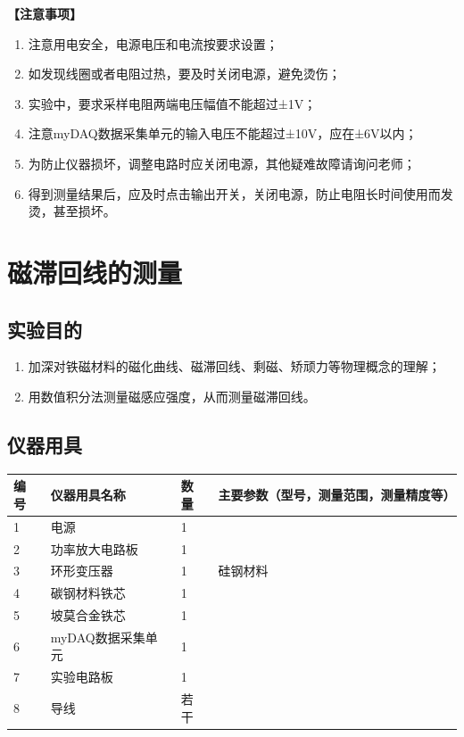 \documentclass[dvipsnames, svgnames,a4paper,11pt]{article}
\begin{document}
{\textbf{【注意事项】}
\begin{enumerate}
	\item 注意用电安全，电源电压和电流按要求设置；
	\item 如发现线圈或者电阻过热，要及时关闭电源，避免烫伤；
	\item 实验中，要求采样电阻两端电压幅值不能超过±1V；
    \item 注意myDAQ数据采集单元的输入电压不能超过±10V，应在±6V以内；
    \item 为防止仪器损坏，调整电路时应关闭电源，其他疑难故障请询问老师；
    \item 得到测量结果后，应及时点击输出开关，关闭电源，防止电阻长时间使用而发烫，甚至损坏。
    
\end{enumerate}}

\clearpage
\tableofcontents
\clearpage

\setcounter{section}{0}
\section{磁滞回线的测量}
	
\subsection{实验目的}
\begin{enumerate}
	\item 加深对铁磁材料的磁化曲线、磁滞回线、剩磁、矫顽力等物理概念的理解；
	\item 用数值积分法测量磁感应强度，从而测量磁滞回线。
\end{enumerate}

\subsection{仪器用具}
\begin{table}[htbp]
	\centering
	\renewcommand\arraystretch{1.6}
	\begin{tabular}{p{}|p{}|p{}|p{}}
	\hline
	编号& 仪器用具名称 & 数量 &  主要参数（型号，测量范围，测量精度等） \\
	\hline
	1&电源&1 &\\
	\hline
	2&功率放大电路板 &1&\\
	\hline
	3&环形变压器 & 1 &硅钢材料 \\
	\hline
	4&碳钢材料铁芯&1 &  \\
	\hline
	5& 坡莫合金铁芯&1& \\
	\hline
	6& myDAQ数据采集单元&1& \\
	\hline
	7& 实验电路板&1& \\
	\hline
	8& 导线&若干& \\
	\hline
\end{tabular}
\end{table}
\end{document}
